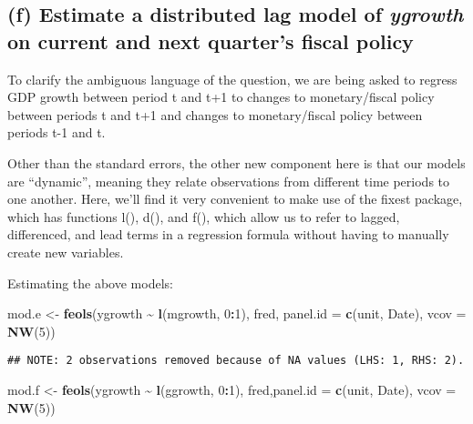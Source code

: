 \documentclass[
]{article}
\newenvironment{Shaded}{\begin{snugshade}}{\end{snugshade}}
\newcommand{\AttributeTok}[1]{\textcolor[rgb]{0.13,0.29,0.53}{#1}}
\newcommand{\DecValTok}[1]{\textcolor[rgb]{0.00,0.00,0.81}{#1}}
\newcommand{\FunctionTok}[1]{\textcolor[rgb]{0.13,0.29,0.53}{\textbf{#1}}}
\newcommand{\NormalTok}[1]{#1}
\newcommand{\OtherTok}[1]{\textcolor[rgb]{0.56,0.35,0.01}{#1}}
\newcommand{\SpecialCharTok}[1]{\textcolor[rgb]{0.81,0.36,0.00}{\textbf{#1}}}
\newcommand{\StringTok}[1]{\textcolor[rgb]{0.31,0.60,0.02}{#1}}
\begin{document}
\hypertarget{f-estimate-a-distributed-lag-model-of-ygrowth-on-current-and-next-quarters-fiscal-policy}{%
\subsection{\texorpdfstring{(f) Estimate a distributed lag model of
\emph{ygrowth} on current and next quarter's fiscal
policy}{(f) Estimate a distributed lag model of ygrowth on current and next quarter's fiscal policy}}\label{f-estimate-a-distributed-lag-model-of-ygrowth-on-current-and-next-quarters-fiscal-policy}}

To clarify the ambiguous language of the question, we are being asked to
regress GDP growth between period t and t+1 to changes to
monetary/fiscal policy between periods t and t+1 and changes to
monetary/fiscal policy between periods t-1 and t.

Other than the standard errors, the other new component here is that our
models are ``dynamic'', meaning they relate observations from different
time periods to one another. Here, we'll find it very convenient to make
use of the fixest package, which has functions l(), d(), and f(), which
allow us to refer to lagged, differenced, and lead terms in a regression
formula without having to manually create new variables.

Estimating the above models:

\begin{Shaded}
\begin{Highlighting}[]
\NormalTok{mod.e }\OtherTok{\textless{}{-}} \FunctionTok{feols}\NormalTok{(ygrowth }\SpecialCharTok{\textasciitilde{}} \FunctionTok{l}\NormalTok{(mgrowth, }\DecValTok{0}\SpecialCharTok{:}\DecValTok{1}\NormalTok{), fred,}
               \AttributeTok{panel.id =} \FunctionTok{c}\NormalTok{(}\StringTok{\textquotesingle{}unit\textquotesingle{}}\NormalTok{, }\StringTok{\textquotesingle{}Date\textquotesingle{}}\NormalTok{),}
               \AttributeTok{vcov =} \FunctionTok{NW}\NormalTok{(}\DecValTok{5}\NormalTok{))}
\end{Highlighting}
\end{Shaded}

\begin{verbatim}
## NOTE: 2 observations removed because of NA values (LHS: 1, RHS: 2).
\end{verbatim}

\begin{Shaded}
\begin{Highlighting}[]
\NormalTok{mod.f }\OtherTok{\textless{}{-}} \FunctionTok{feols}\NormalTok{(ygrowth }\SpecialCharTok{\textasciitilde{}} \FunctionTok{l}\NormalTok{(ggrowth, }\DecValTok{0}\SpecialCharTok{:}\DecValTok{1}\NormalTok{),}
\NormalTok{               fred,}\AttributeTok{panel.id =} \FunctionTok{c}\NormalTok{(}\StringTok{\textquotesingle{}unit\textquotesingle{}}\NormalTok{, }\StringTok{\textquotesingle{}Date\textquotesingle{}}\NormalTok{),}
               \AttributeTok{vcov =} \FunctionTok{NW}\NormalTok{(}\DecValTok{5}\NormalTok{))}
\end{Highlighting}
\end{Shaded}
\end{document}
